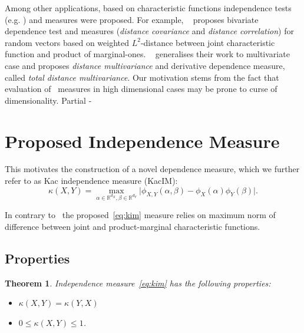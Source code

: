 \documentclass{article}
\newtheorem{theorem}{Theorem}
\begin{document}
Among other applications, based on characteristic functions independence tests (e.g. \cite{Feuerverger}) and measures were proposed.
For example, ~\cite{Szekely} proposes  bivariate dependence test and measures (\textit{distance covariance} and \textit{distance correlation}) for random vectors based on weighted $L^{2}$-distance between joint characteristic function and product of marginal-ones. ~\cite{Bottcher} generalises their work to multivariate case and proposes \textit{distance multivariance} and derivative dependence measure, called  \textit{total distance multivariance}. 
Our motivation stems from the fact that evaluation of~\cite{Szekely} measures in high dimensional cases may be prone to curse of dimensionality.
Partial - \cite{Szkely2013PartialDC}

\section{Proposed Independence Measure}
\label{section:proposed_method}



\noindent This motivates the construction of a novel dependence measure, which we further refer to as Kac independence measure (KacIM):
\begin{equation}
\label{eq:kim}
    \kappa(X,Y) = \max_{\alpha \in \mathbb{R}^{d_{X}}, \beta \in \mathbb{R}^{d_{Y}}} \vert \phi_{X,Y}(\alpha, \beta)  -\phi_{X}(\alpha) \phi_{Y}(\beta) \vert.
\end{equation}

In contrary to~\cite{Szekely} the proposed~\eqref{eq:kim} measure relies on maximum norm of difference between joint and product-marginal characteristic functions.



\subsection{Properties}
\begin{theorem}
\label{thm:properties}
  Independence measure~\eqref{eq:kim} has the following properties:
  \begin{itemize} 
    \item $\kappa(X,Y) = \kappa(Y,X)$
    \item $0 \leq \kappa(X,Y) \leq 1$.
   \end{itemize}    
\end{theorem}
\end{document}
